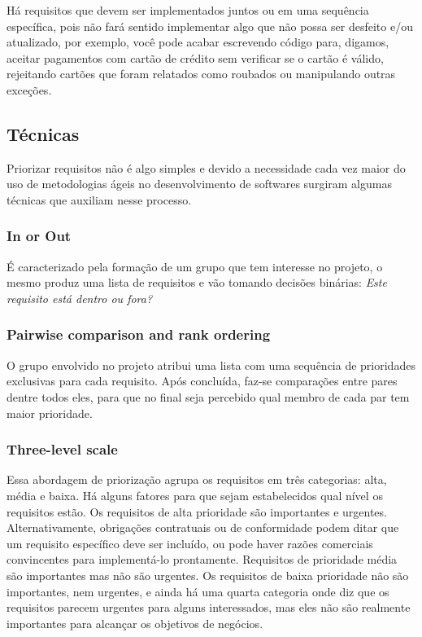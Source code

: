 \documentclass[runningheads]{llncs}
\begin{document}
Há requisitos que devem ser implementados juntos ou em uma sequência específica, pois não fará sentido implementar algo que não possa ser desfeito e/ou atualizado, por exemplo, você pode acabar escrevendo código para, digamos, aceitar pagamentos com cartão de crédito sem verificar se o cartão é válido, rejeitando cartões que foram relatados como roubados ou manipulando outras exceções.

\subsection{Técnicas}

Priorizar requisitos não é algo simples e devido a necessidade cada vez maior do uso de metodologias ágeis no desenvolvimento de softwares surgiram algumas técnicas que auxiliam nesse processo.

\subsubsection{In or Out}
É caracterizado pela formação de um grupo que tem interesse no projeto, o mesmo produz uma lista de requisitos e vão tomando decisões binárias: \textit{Este requisito está dentro ou fora?}

\subsubsection{Pairwise comparison and rank ordering}
O grupo envolvido no projeto atribui uma lista com uma sequência de prioridades exclusivas para cada requisito. Após concluída, faz-se comparações entre pares dentre todos eles, para que no final seja percebido qual membro de cada par tem maior prioridade.

\subsubsection{Three-level scale}
Essa abordagem de priorização agrupa os requisitos em três categorias: alta, média e baixa. Há alguns fatores para que sejam estabelecidos qual nível os requisitos estão. Os requisitos de alta prioridade são importantes e urgentes. Alternativamente, obrigações contratuais ou de conformidade podem ditar que um requisito específico deve ser incluído, ou pode haver razões comerciais convincentes para implementá-lo prontamente. Requisitos de prioridade média são importantes mas não são urgentes. Os requisitos de baixa prioridade não são importantes, nem urgentes, e ainda há uma quarta categoria onde diz que os requisitos parecem urgentes para alguns interessados, mas eles não são realmente importantes para alcançar os objetivos de negócios.
\end{document}
